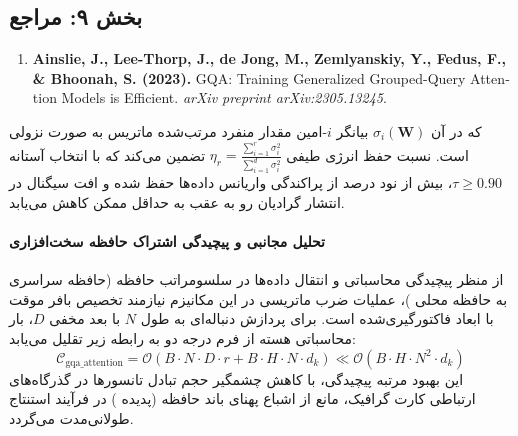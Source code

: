
\subsection*{بخش ۹: مراجع }
\begin{latin}
\begin{enumerate}
    \item \textbf{Ainslie, J., Lee-Thorp, J., de Jong, M., Zemlyanskiy, Y., Fedus, F., \& Bhoonah, S. (2023).} GQA: Training Generalized Grouped-Query Attention Models is Efficient. \textit{arXiv preprint arXiv:2305.13245}.
\end{enumerate}
\end{latin}

که در آن $\sigma_i(\mathbf{W})$ بیانگر $i$-امین مقدار منفرد مرتب‌شده ماتریس به صورت نزولی است. نسبت حفظ انرژی طیفی $\eta_r = \frac{\sum_{i=1}^r \sigma_i^2}{\sum_{i=1}^{d} \sigma_i^2}$ تضمین می‌کند که با انتخاب آستانه $\tau \ge 0.90$، بیش از نود درصد از پراکندگی واریانس داده‌ها حفظ شده و افت سیگنال در انتشار گرادیان رو به عقب به حداقل ممکن کاهش می‌یابد.

\paragraph{تحلیل مجانبی و پیچیدگی اشتراک حافظه سخت‌افزاری}
از منظر پیچیدگی محاسباتی و انتقال داده‌ها در سلسومراتب حافظه (حافظه سراسری  به حافظه محلی )، عملیات ضرب ماتریسی در این مکانیزم نیازمند تخصیص بافر موقت با ابعاد فاکتورگیری‌شده است. برای پردازش دنباله‌ای به طول $N$ با بعد مخفی $D$، بار محاسباتی هسته از فرم درجه دو به رابطه زیر تقلیل می‌یابد:
\begin{equation}
\label{eq:complexity_gqa_attention}
\mathcal{C}_{\text{gqa\_attention}} = \mathcal{O}\left( B \cdot N \cdot D \cdot r + B \cdot H \cdot N \cdot d_k \right) \ll \mathcal{O}\left( B \cdot H \cdot N^2 \cdot d_k \right)
\end{equation}
این بهبود مرتبه پیچیدگی، با کاهش چشمگیر حجم تبادل تانسورها در گذرگاه‌های ارتباطی کارت گرافیک، مانع از اشباع پهنای باند حافظه (پدیده ) در فرآیند استنتاج طولانی‌مدت می‌گردد.